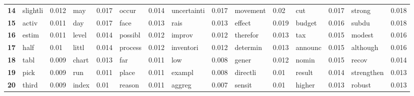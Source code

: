 \begin{tabular}{|l|l|l||l|l||l|l||l|l||l|l||l|l||l|l||}
\textbf{14} &  slightli &  0.012 &  may &  0.017 &  occur &  0.014 &  uncertainti &  0.017 &  movement &  0.02 &  cut &  0.017 &  strong &  0.018 \\
\textbf{15} &  activ &  0.011 &  day &  0.017 &  face &  0.013 &  rais &  0.013 &  effect &  0.019 &  budget &  0.016 &  subdu &  0.018 \\
\textbf{16} &  estim &  0.011 &  level &  0.014 &  possibl &  0.012 &  improv &  0.012 &  therefor &  0.013 &  tax &  0.015 &  modest &  0.016 \\
\textbf{17} &  half &  0.01 &  littl &  0.014 &  process &  0.012 &  inventori &  0.012 &  determin &  0.013 &  announc &  0.015 &  although &  0.016 \\
\textbf{18} &  tabl &  0.009 &  chart &  0.013 &  far &  0.011 &  low &  0.008 &  gener &  0.012 &  nomin &  0.015 &  recov &  0.014 \\
\textbf{19} &  pick &  0.009 &  run &  0.011 &  place &  0.011 &  exampl &  0.008 &  directli &  0.01 &  result &  0.014 &  strengthen &  0.013 \\
\textbf{20} &  third &  0.009 &  index &  0.01 &  reason &  0.011 &  aggreg &  0.007 &  sensit &  0.01 &  higher &  0.013 &  robust &  0.013 \\
\bottomrule
\end{tabular}
